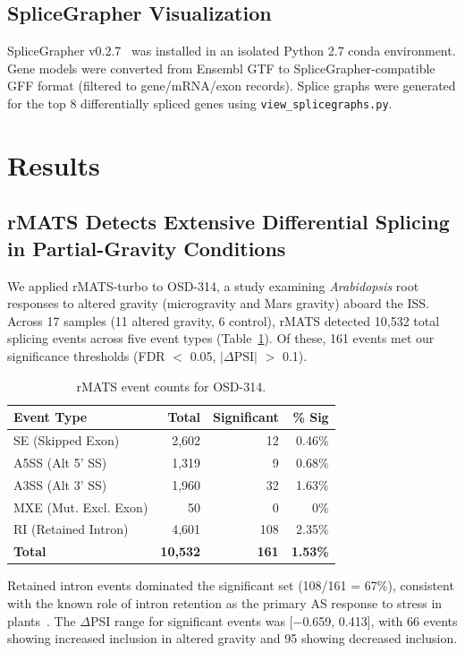 \documentclass[12pt,a4paper]{article}
\begin{document}
\subsection{SpliceGrapher Visualization}

SpliceGrapher v0.2.7~\cite{splicegrapher} was installed in an isolated Python 2.7 conda environment. Gene models were converted from Ensembl GTF to SpliceGrapher-compatible GFF format (filtered to gene/mRNA/exon records). Splice graphs were generated for the top 8 differentially spliced genes using \texttt{view\_splicegraphs.py}.

\section{Results}

\subsection{rMATS Detects Extensive Differential Splicing in Partial-Gravity Conditions}

We applied rMATS-turbo to OSD-314, a study examining \textit{Arabidopsis} root responses to altered gravity (microgravity and Mars gravity) aboard the ISS. Across 17 samples (11 altered gravity, 6 control), rMATS detected 10,532 total splicing events across five event types (Table~\ref{tab:osd314_events}). Of these, 161 events met our significance thresholds (FDR $<$ 0.05, $|\Delta\text{PSI}|$ $>$ 0.1).

\begin{table}[h]
\centering
\caption{rMATS event counts for OSD-314.}
\label{tab:osd314_events}
\begin{tabular}{lrrr}
\toprule
\textbf{Event Type} & \textbf{Total} & \textbf{Significant} & \textbf{\% Sig} \\
\midrule
SE (Skipped Exon) & 2,602 & 12 & 0.46\% \\
A5SS (Alt 5' SS) & 1,319 & 9 & 0.68\% \\
A3SS (Alt 3' SS) & 1,960 & 32 & 1.63\% \\
MXE (Mut. Excl. Exon) & 50 & 0 & 0\% \\
RI (Retained Intron) & 4,601 & 108 & 2.35\% \\
\textbf{Total} & \textbf{10,532} & \textbf{161} & \textbf{1.53\%} \\
\bottomrule
\end{tabular}
\end{table}

Retained intron events dominated the significant set (108/161 = 67\%), consistent with the known role of intron retention as the primary AS response to stress in plants~\cite{kalyna2012}. The $\Delta$PSI range for significant events was [$-$0.659, 0.413], with 66 events showing increased inclusion in altered gravity and 95 showing decreased inclusion.
\end{document}
